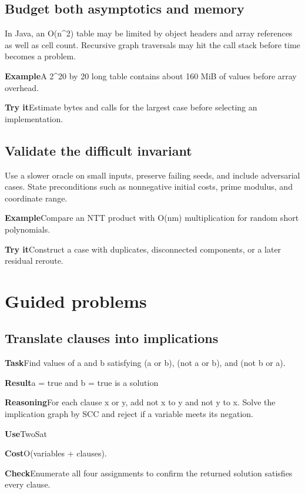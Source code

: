 \documentclass[10pt,letterpaper]{article}
\newcommand{\entrylabel}[1]{\textcolor{accent}{\bfseries #1}}
\begin{document}
\subsection*{Budget both asymptotics and memory}
In Java, an O(n\textasciicircum{}2) table may be limited by object headers and array references as well as cell count. Recursive graph traversals may hit the call stack before time becomes a problem.\par
\begin{guidebox}\entrylabel{Example}\quad A 2\textasciicircum{}20 by 20 long table contains about 160 MiB of values before array overhead.\par
\entrylabel{Try it}\quad Estimate bytes and calls for the largest case before selecting an implementation.\end{guidebox}
\subsection*{Validate the difficult invariant}
Use a slower oracle on small inputs, preserve failing seeds, and include adversarial cases. State preconditions such as nonnegative initial costs, prime modulus, and coordinate range.\par
\begin{guidebox}\entrylabel{Example}\quad Compare an NTT product with O(nm) multiplication for random short polynomials.\par
\entrylabel{Try it}\quad Construct a case with duplicates, disconnected components, or a later residual reroute.\end{guidebox}
\clearpage\section*{Guided problems}
\subsection*{Translate clauses into implications}
\noindent\entrylabel{Task}\quad Find values of a and b satisfying (a or b), (not a or b), and (not b or a).\par
\noindent\entrylabel{Result}\quad a = true and b = true is a solution\par
\noindent\entrylabel{Reasoning}\quad For each clause x or y, add not x to y and not y to x. Solve the implication graph by SCC and reject if a variable meets its negation.\par
\noindent\entrylabel{Use}\quad TwoSat\par
\noindent\entrylabel{Cost}\quad O(variables + clauses).\par
\noindent\entrylabel{Check}\quad Enumerate all four assignments to confirm the returned solution satisfies every clause.\par
\end{document}
